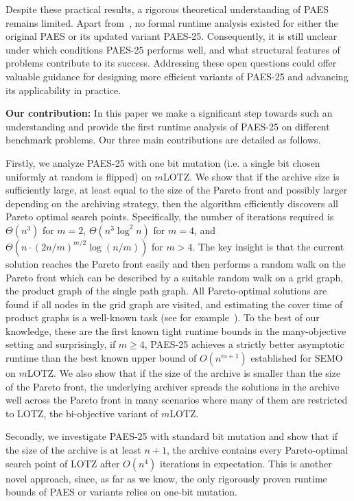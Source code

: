 \documentclass[
sigconf = false, %
review = false, %
screen = true, %
anonymous = true, %
format=acmsmall
]{acmart}
\newcommand{\LOTZ}{\textsc{LOTZ}\xspace}
\newcommand{\mLOTZ}{\ensuremath{m}\text{-}\textsc{LOTZ}\xspace}
\newcommand{\PAES}{PAES-25\xspace}
\begin{document}
Despite these practical results, a rigorous theoretical understanding of PAES remains limited. Apart from~\cite{PAESFIRST}, no formal runtime analysis existed for either the original PAES or its updated variant \PAES. Consequently, it is still unclear under which conditions \PAES performs well, and what structural features of problems contribute to its success. Addressing these open questions could offer valuable guidance for designing more efficient variants of \PAES and advancing its applicability in practice.

\textbf{Our contribution:} In this paper we make a significant step towards such an understanding and provide the first runtime analysis of \PAES on different benchmark problems. Our three main contributions are detailed as follows.

Firstly, we analyze \PAES with one bit mutation (i.e. a single bit chosen uniformly at random is flipped) on \mLOTZ. We show that if the archive size is sufficiently large, at least equal to the size of the Pareto front and possibly larger depending on the archiving strategy, then the algorithm efficiently discovers all Pareto optimal search points. Specifically, the number of iterations required is $\Theta(n^3)$ for $m = 2$, $ \Theta(n^3 \log^2 n) $ for $m = 4$, and $ \Theta(n \cdot (2n/m)^{m/2} \log(n/m))$ for $m > 4$. The key insight is that the current solution reaches the Pareto front easily and then performs a random walk on the Pareto front which can be described by a suitable random walk on a grid graph, the product graph of the single path graph. All Pareto-optimal solutions are found if all nodes in the grid graph are visited, and estimating the cover time of product graphs is a well-known task (see for example~\cite{JONASSON2000181}). To the best of our knowledge, these are the first known tight runtime bounds in the many-objective setting and surprisingly, if $ m \geq 4$, \PAES achieves a strictly better asymptotic runtime than the best known upper bound of $O(n^{m+1})$ established for SEMO on \mLOTZ. We also show that if the size of the archive is smaller than the size of the Pareto front, the underlying archiver spreads the solutions in the archive well across the Pareto front in many scenarios where many of them are restricted to \LOTZ, the bi-objective variant of \mLOTZ.

Secondly, we investigate \PAES with standard bit mutation and show that if the size of the archive is at least $n+1$, the archive contains every Pareto-optimal search point of \LOTZ after $O(n^4)$ iterations in expectation. This is another novel approach, since, as far as we know, the only rigorously proven runtime bounds of PAES or variants relies on one-bit mutation.
\end{document}
